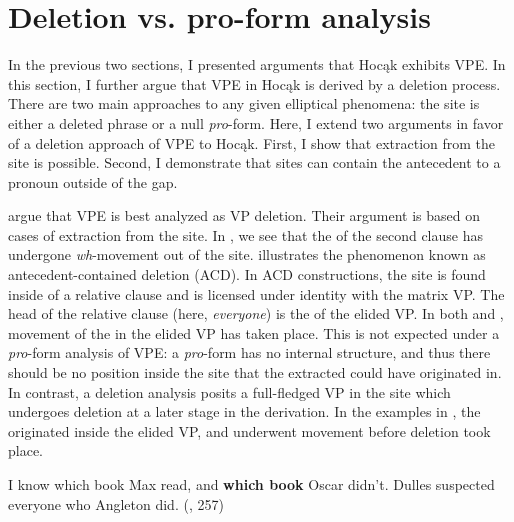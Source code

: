 \documentclass[output=paper]{LSP/langsci}
\begin{document}
\section{Deletion vs. pro-form analysis}\label{sec:johnson:4}

 
In the previous two sections, I presented arguments that Hocąk exhibits VPE. In this section, I further argue that VPE in Hocąk is derived by a deletion process. There are two main approaches to any given elliptical phenomena: the  site is either a deleted phrase or a null \emph{pro}-form. Here, I extend two arguments in favor of a deletion approach of  VPE to Hocąk. First, I show that extraction from the  site is possible. Second, I demonstrate that  sites can contain the antecedent to a pronoun outside of the gap.
 

\citet{FiengoMay1994} argue that  VPE is best analyzed as VP deletion. Their argument is based on cases of  extraction from the  site. In , we see that the  of the second clause has undergone \emph{wh}-movement out of the  site.  illustrates the phenomenon known as antecedent-contained deletion (ACD). In ACD constructions, the  site is found inside of a relative clause and is licensed under identity with the matrix VP. The head of the relative clause (here, \emph{everyone}) is the  of the elided VP. In both  and , movement of the  in the elided VP has taken place. This is not expected under a \emph{pro}-form analysis of VPE: a \emph{pro}-form has no internal structure, and thus there should be no  position inside the  site that the extracted  could have originated in. In contrast, a deletion analysis posits a full-fledged VP in the  site which undergoes deletion at a later stage in the derivation. In the examples in , the  originated inside the elided VP, and underwent movement before deletion took place.
 
\ea\label{ex:johnson:46}
\ea\label{ex:johnson:46a}
I know which book Max read, and \textbf{which book} Oscar didn't.
\ex\label{ex:johnson:46b} 
Dulles suspected everyone who Angleton did. (\citealt[229]{FiengoMay1994}, 257)
\z
\z
\end{document}

